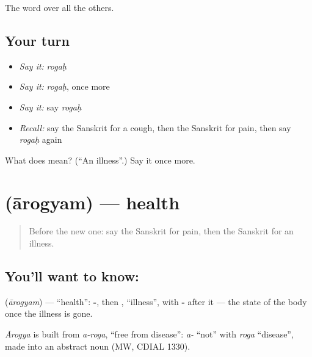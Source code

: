 \begin{grammarlens}[title={What you've built}]
The word over all the others.
\end{grammarlens}

\subsection*{Your turn}
\begin{itemize}
\raggedright
  \item \emph{Say it:} \emph{rogaḥ}
  \item \emph{Say it:} \emph{rogaḥ}, once more
  \item \emph{Say it:} say \emph{rogaḥ}
  \item \emph{Recall:} say the Sanskrit for a cough, then the Sanskrit for pain, then say \emph{rogaḥ} again
\end{itemize}

\begin{tcolorbox}[breakable,colback=teal!4,colframe=teal!35!black,title={Before you move on}]
What does  mean? (\textquotedblleft{}An illness\textquotedblright{}.) Say it once more.
\end{tcolorbox}
\section[\texorpdfstring{\sk{आरोग्यम्} (ārogyam)}{आरोग्यम् (ārogyam)}]{ (ārogyam) — health}

\label{lesson:SA-C66-health}



\begin{quote}
Before the new one: say the Sanskrit for pain, then the Sanskrit for an illness.
\end{quote}

\subsection*{You'll want to know: }
\textbf{} (\emph{ārogyam}) — \textquotedblleft{}health\textquotedblright{}: \textbf{-}, then \textbf{}, \textquotedblleft{}illness\textquotedblright{}, with \textbf{-} after it — the state of the body once the illness is gone.

\begin{cousinweb}
\emph{Ārogya} is built from \emph{a-roga}, \textquotedblleft{}free from disease\textquotedblright{}: \emph{a-} \textquotedblleft{}not\textquotedblright{} with \emph{roga} \textquotedblleft{}disease\textquotedblright{}, made into an abstract noun (MW, CDIAL 1330).
\end{cousinweb}

